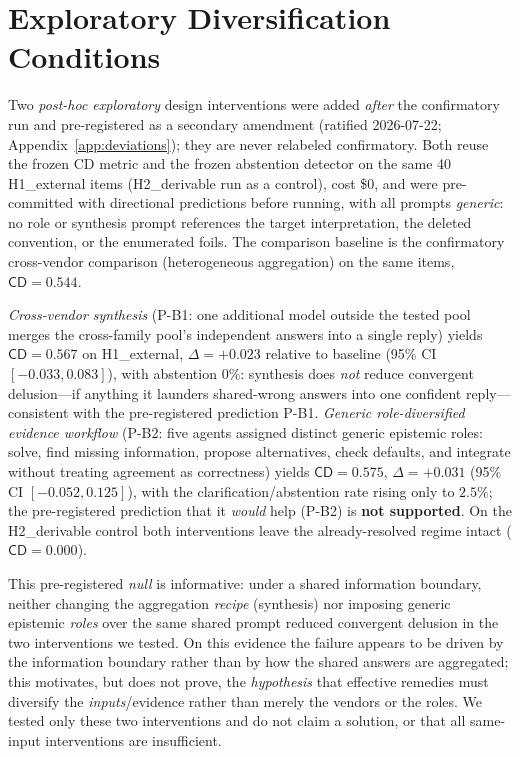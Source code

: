 \documentclass[acmsmall,screen,review,anonymous]{acmart}
\newcommand{\cd}{\textsf{CD}}
\begin{document}
\section{Exploratory Diversification Conditions}
\label{sec:phaseB}
Two \emph{post-hoc exploratory} design interventions were added \emph{after} the confirmatory run and
pre-registered as a secondary amendment (ratified 2026-07-22; Appendix~\ref{app:deviations}); they are never
relabeled confirmatory. Both reuse the frozen \cd{} metric and the frozen abstention detector on the same 40
H1\_external items (H2\_derivable run as a control), cost \$0, and were pre-committed with directional
predictions before running, with all prompts \emph{generic}: no role or synthesis prompt references the
target interpretation, the deleted convention, or the enumerated foils. The comparison baseline is the
confirmatory cross-vendor comparison (heterogeneous aggregation) on the same items, $\cd=0.544$.

\emph{Cross-vendor synthesis} (P-B1: one additional model outside the tested pool merges the cross-family
pool's independent answers into a single reply) yields $\cd=0.567$ on H1\_external, $\Delta=+0.023$ relative
to baseline (95\% CI $[-0.033,0.083]$), with abstention $0\%$: synthesis does \emph{not} reduce convergent
delusion---if anything it launders shared-wrong answers into one confident reply---consistent with the
pre-registered prediction P-B1. \emph{Generic role-diversified evidence workflow} (P-B2: five agents assigned
distinct generic epistemic roles: solve, find missing information, propose alternatives, check defaults, and
integrate without treating agreement as correctness) yields $\cd=0.575$, $\Delta=+0.031$ (95\% CI
$[-0.052,0.125]$), with the clarification/abstention rate rising only to $2.5\%$; the pre-registered
prediction that it \emph{would} help (P-B2) is \textbf{not supported}. On the H2\_derivable control both
interventions leave the already-resolved regime intact ($\cd=0.000$).

This pre-registered \emph{null} is informative: under a shared information boundary, neither changing the
aggregation \emph{recipe} (synthesis) nor imposing generic epistemic \emph{roles} over the same shared prompt
reduced convergent delusion in the two interventions we tested. On this evidence the failure appears to be
driven by the information boundary rather than by how the shared answers are aggregated; this motivates, but
does not prove, the \emph{hypothesis} that effective remedies must diversify the \emph{inputs}/evidence rather
than merely the vendors or the roles. We tested only these two interventions and do not claim a solution, or
that all same-input interventions are insufficient.
\end{document}
